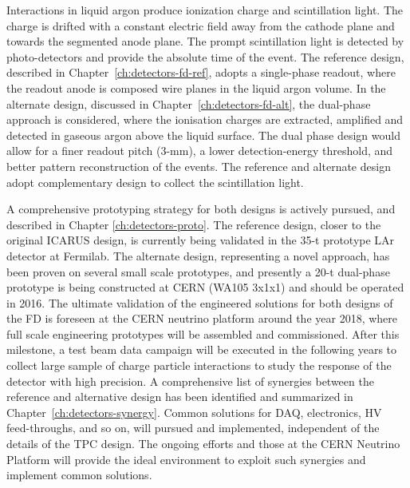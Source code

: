 Interactions in liquid argon produce ionization charge and scintillation light.
The charge is drifted with a constant electric field away from the cathode
plane and towards the segmented anode plane. 
The prompt scintillation light
is detected by photo-detectors and provide the absolute time of the event.
The reference design, described in Chapter~\ref{ch:detectors-fd-ref},
adopts a single-phase readout, where the readout anode is composed wire planes in the liquid argon volume. 
In the alternate design, discussed in Chapter~\ref{ch:detectors-fd-alt}, the  dual-phase approach is considered, where the 
ionisation charges are extracted, amplified and detected in gaseous argon above the liquid surface. 
The dual phase design would allow for a finer readout pitch (3-mm), 
a lower detection-energy threshold, and better pattern reconstruction of the events.
The reference and alternate design adopt complementary design 
to collect the scintillation light.

A  comprehensive prototyping strategy for both designs is actively pursued, and described in Chapter \ref{ch:detectors-proto}.
The reference design, closer to the original ICARUS design, is currently being validated in the 35-t prototype LAr detector at Fermilab.  The alternate design, representing a novel approach, has been proven on several
small scale prototypes, and presently
a 20-t dual-phase prototype is being constructed at CERN (WA105 3x1x1) and should be operated in 2016. 
The ultimate validation of the engineered solutions for both designs of the FD is foreseen at 
the CERN neutrino platform around the year 2018, where full scale engineering prototypes will be 
assembled and commissioned. After this milestone, a test beam data 
campaign will be executed in the following years to collect large sample of charge particle interactions
to study the response of the detector with high precision.
A comprehensive list of synergies between the reference and alternative design has been identified and summarized in Chapter~\ref{ch:detectors-synergy}. Common solutions for DAQ, electronics, HV feed-throughs, and so on, will pursued and implemented, independent of the details of the TPC design. The ongoing efforts and those at the CERN Neutrino Platform will
provide the ideal environment to exploit such synergies and implement common solutions.

